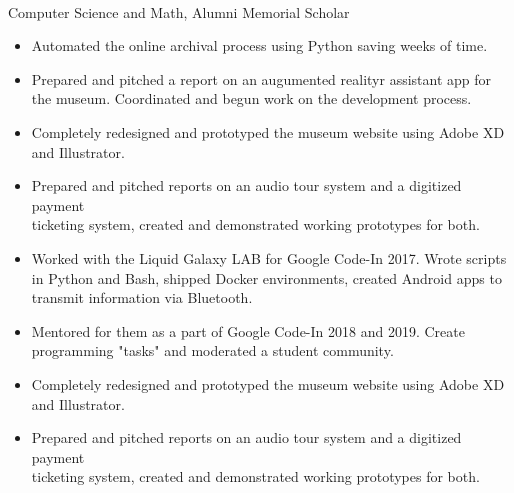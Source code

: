 \documentclass[a4paper]{resume}
\begin{document}
\vspace*{-40pt}


\\Computer Science and Math, Alumni Memorial Scholar
\enresection

\begin{itemize} \vspace{-5pt} \itemsep -2pt
	\item Automated the online archival process using Python saving weeks of time.
	\item Prepared and pitched a report on an augumented realityr assistant app for the museum. Coordinated and begun work on the development process.
	\item Completely redesigned and prototyped the museum website using Adobe XD and Illustrator.
\item Prepared and pitched reports on an audio tour system and a digitized payment\\ticketing system, created and demonstrated working prototypes for both.
\end{itemize}
\begin{itemize} \vspace{-5pt} \itemsep -2pt
	\item Worked with the Liquid Galaxy LAB for Google Code-In 2017. Wrote scripts in Python and Bash, shipped Docker environments, created Android apps to transmit information via Bluetooth.
	\item Mentored for them as a part of Google Code-In 2018 and 2019. Create programming "tasks" and moderated a student community.
	\item Completely redesigned and prototyped the museum website using Adobe XD and Illustrator.
\item Prepared and pitched reports on an audio tour system and a digitized payment\\ticketing system, created and demonstrated working prototypes for both.
\end{itemize}



\end{document}
